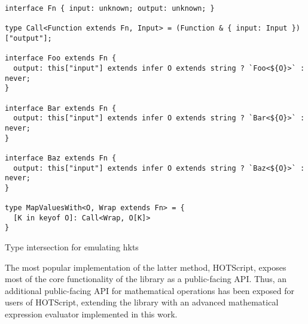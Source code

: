 \clearpage

\begin{listing}[ht]
  \begin{verbatim}
interface Fn { input: unknown; output: unknown; }

type Call<Function extends Fn, Input> = (Function & { input: Input })["output"];

interface Foo extends Fn {
  output: this["input"] extends infer O extends string ? `Foo<${O}>` : never;
}

interface Bar extends Fn {
  output: this["input"] extends infer O extends string ? `Bar<${O}>` : never;
}

interface Baz extends Fn {
  output: this["input"] extends infer O extends string ? `Baz<${O}>` : never;
}

type MapValuesWith<O, Wrap extends Fn> = {
  [K in keyof O]: Call<Wrap, O[K]>
}
\end{verbatim}
  \caption{Type intersection for emulating \acrshort{hkt}s}\label{lst:emulating-hkt}
\end{listing}

The most popular implementation of the latter method, HOTScript, exposes most of the core functionality of the library as a public-facing API. Thus, an additional public-facing API for mathematical operations has been exposed for users of HOTScript, extending the library with an advanced mathematical expression evaluator implemented in this work.
